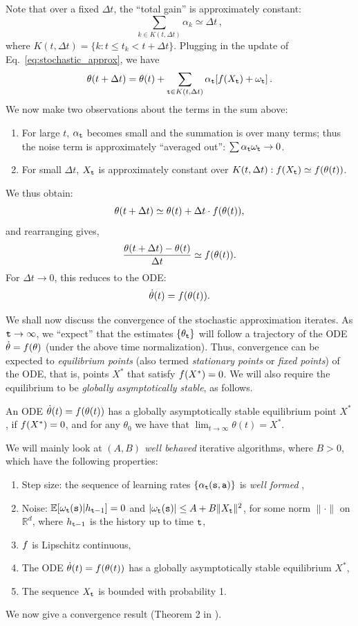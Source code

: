 Note that over a fixed $\Delta t$, the ``total gain'' is approximately
constant:
$$
\sum_{k\in K(t, \Delta t)} \alpha_k \simeq \Delta t\,,
$$
where $K(t,\Delta t) = \{k: t \le t_k < t+ \Delta t\}$.
Plugging in the update of Eq.~\ref{eq:stochastic_approx}, we have
$$
\theta(t+\Delta t) = \theta(t) + \sum_{{\tt t}\in K(t, \Delta t)} \alpha_{\tt t} [f(X_{\tt t})
+\omega_{\tt t}] \,.
$$
We now make two observations about the terms in the sum above:
\begin{enumerate}
\item
For large $t$, $\alpha_{\tt t}$ becomes small and the summation is over many
terms; thus the noise term is approximately ``averaged out'':
$\sum \alpha_{\tt t} \omega_{\tt t} \to 0$.
\item
For small $\Delta t$, $X_{\tt t}$ is approximately constant over $K(t, \Delta t):
f(X_{\tt t}) \simeq f(\theta(t))$.
\end{enumerate}
We thus obtain:
$$
\theta(t+\Delta t) \simeq \theta(t) +\Delta t\cdot f (\theta(t)),
$$
and rearranging gives,
$$
\frac{\theta(t+\Delta t) - \theta(t)}{\Delta t} \simeq  f (\theta(t)).
$$
For $\Delta t \to 0$, this reduces to the ODE:
$$
\dot \theta(t) = f(\theta(t)).
$$

We shall now discuss the convergence of the stochastic approximation iterates.  As ${\tt t}\to\infty$, we ``expect'' that the estimates
$\{\theta_{\tt t}\}$ will follow a trajectory of the ODE $\dot\theta=f(\theta)$
(under the above time normalization). Thus, convergence can be expected to \textit{equilibrium points} (also termed \textit{stationary points} or \textit{fixed points}) of the ODE, that is, points $X^*$ that satisfy 
$f(X^*) = 0$. We will also require the equilibrium to be {\em globally asymptotically stable}, as follows.
\begin{definition}
An ODE $\dot \theta(t) = f(\theta(t))$ has a globally asymptotically stable equilibrium point $X^*$, if $f(X^*) = 0$, and
for any $\theta_0$ we have that $\lim_{t \to \infty} \theta(t) = X^*$.
\end{definition}

We will mainly look at {\em $(A,B)$ well behaved} iterative
algorithms, where $B>0$, which have the
following properties:
\begin{enumerate}
\item Step size: the sequence of learning rates $\{\alpha_{\tt t}({\tt s},{\tt a})\}$ is \emph{well formed} ,
\item Noise: $\mathbb{E}[\omega_{\tt t}({\tt s})|h_{{\tt t}-1}]=0$ and $|\omega_{\tt t}({\tt s})|\leq A + B\| X_{\tt t}\|^2$, for some norm $\| \cdot \|$ on $\mathbb{R}^d$, where
$h_{{\tt t}-1}$ is the history up to time ${\tt t}$,
\item $f$ is Lipschitz continuous,
\item The ODE $\dot \theta(t) = f(\theta(t))$ has a globally asymptotically stable equilibrium $X^*$,
\item The sequence $X_{\tt t}$ is bounded with probability 1.
\end{enumerate}
We now give a convergence result (Theorem 2 in \citep{borkar2009stochastic}).

